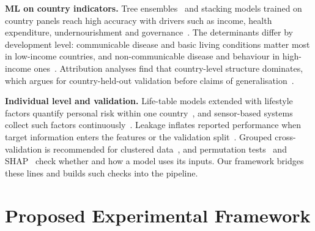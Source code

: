 \documentclass[runningheads]{llncs}
\begin{document}
\textbf{ML on country indicators.} Tree ensembles~\cite{breiman2001,friedman2001} and stacking
models trained on country panels reach high accuracy with drivers such as income, health
expenditure, undernourishment and governance~\cite{chinthaginjala2026a,ahamad2025,zhang2025,visbal2026}.
The determinants differ by development level: communicable disease and basic living conditions
matter most in low-income countries, and non-communicable disease and behaviour in high-income
ones~\cite{vladimirskaya2023,zhang2025}. Attribution analyses find that country-level structure
dominates, which argues for country-held-out validation before claims of
generalisation~\cite{chinthaginjala2026b}.

\textbf{Individual level and validation.} Life-table models extended with lifestyle factors
quantify personal risk within one country~\cite{jackowska2024}, and sensor-based systems collect
such factors continuously~\cite{bopushova2026}. Leakage inflates reported performance when target
information enters the features or the validation split~\cite{kaufman2012}. Grouped
cross-validation is recommended for clustered data~\cite{roberts2017}, and permutation
tests~\cite{ojala2010} and SHAP~\cite{lundberg2017,lundberg2020} check whether and how a model uses
its inputs. Our framework bridges these lines and builds such checks into the pipeline.

\section{Proposed Experimental Framework}
\end{document}
